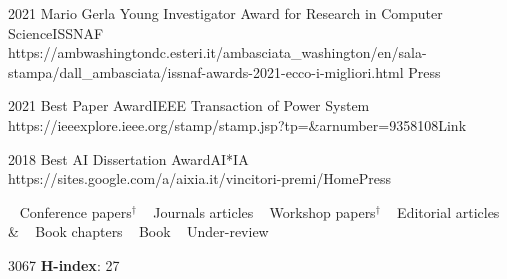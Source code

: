 \documentclass[localFont,alternative]{documentMETADATA}
\def\citNo{3067}
\def\hIndex{27}
\begin{document}
\begin{awards}
	\awardentry
	{2021}
	{Mario Gerla Young Investigator Award for Research in Computer Science}{ISSNAF}
	{https://ambwashingtondc.esteri.it/ambasciata_washington/en/sala-stampa/dall_ambasciata/issnaf-awards-2021-ecco-i-migliori.html}
	{Press}

		
	\awardentry
	{2021}
	{Best Paper Award}{IEEE Transaction of Power System}
	{https://ieeexplore.ieee.org/stamp/stamp.jsp?tp=\&arnumber=9358108}{Link}

	\awardentry
	{2018}
	{Best AI Dissertation Award}{AI*IA} %
	{https://sites.google.com/a/aixia.it/vincitori-premi/Home}{Press}


\end{awards}	



\begin{keywords}
{			 \faAngleRight~  Conference papers$^{\dagger}$
\hspace{4pt} \faAngleRight~  Journals articles
\hspace{4pt} \faAngleRight~  Workshop papers$^{\dagger}$
\hspace{4pt} \faAngleRight~  Editorial articles
		 \\& \faAngleRight~  Book chapters
\hspace{4pt} \faAngleRight~  Book
\hspace{4pt} \faAngleRight~  Under-review
}

{\citNo \hspace{8pt} 
 \textbf{H-index}: \hIndex \hspace{8pt} 
 }%
\end{keywords}
\end{document}
